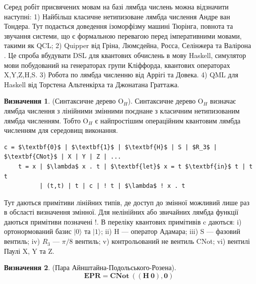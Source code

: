 \documentclass{article}
\theoremstyle{definition}
\newtheorem{definition}{Визначення}
\begin{document}
Серед робіт присвячених мовам на базі лямбда числень можна відзначити наступні:
1) Найбільш класичне нетипизоване лямбда числення Андре ван Тондера\cite{Tonder2004}.
   Тут подається доведення ізоморфізму машині Тюрінга, повнота та звучання системи,
   що є формальною перевагою перед імперативними мовами, такими як QCL;
2) Quipper від Гріна, Люмсдейна, Росса, Селінжера та Валірона \cite{Green2013}\cite{Green2013-2}.
   Це спроба вбудувати DSL для квантових обчислень в мову Haskell, симулятор
   мови побудований на генераторах групи Кліффорда, квантових операторах {X,Y,Z,H,S}.
3) Робота по лямбда численню від Аррігі та Довека\cite{Arrighi2004}.
4) QML для Haskell від Торстена Альтенкірха
   та Джонатана Граттажа\cite{Altenkirch2005}\cite{Altenkirch2007}\cite{Grattage2011}.

\newpage
\begin{definition} (Синтаксичне дерево O$_H$).
Синтаксичне дерево O$_H$ визначає лямбда числення з лінійними змінними
поєднане з класичним нетипизованим лямбда численням. Тобто O$_H$ є
найпростішим операційним квантовим лямбда численням для середовищ виконання.
\begin{lstlisting}[mathescape=true]
    c = $\textbf{0}$ | $\textbf{1}$ | $\textbf{H}$ | S | $R_3$ | $\textbf{CNot}$ | X | Y | Z | ...
    t = x | $\lambda$ x . t | $\textbf{let}$ x = t $\textbf{in}$ t | t t
          | (t,t) | t | c | ! t | $\lambda$ ! x . t
\end{lstlisting}
Тут даються примітиви лінійних типів, де доступ до змінної
можливий лише раз в обсласті визначення змінної. Для нелінійних або звичайних
лямбда функції даються примітиви позначені !. В переліку квантових примітивів
c даються:
i) ортонормований базис $|0\rangle$ та $|1\rangle$;
ii) H --- оператор Адамара;
iii) S --- фазовий вентиль;
iv) $R_3$ --- $\pi/8$ вентиль;
v) контрольований не вентиль CNot;
vi) вентилі Паулі X, Y та Z.
\end{definition}

\begin{definition} (Пара Айнштайна-Подольського-Розена).
\begin{equation}
\textbf{EPR} = \textbf{CNot}\ ((\textbf{H}\ \textbf{0}),\textbf{0})
\end{equation}
\end{definition}
\end{document}
